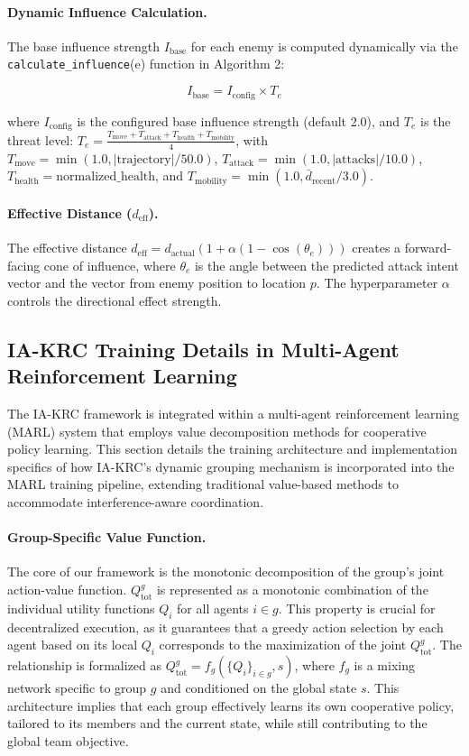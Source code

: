 \paragraph{Dynamic Influence Calculation.}
The base influence strength $I_{\text{base}}$ for each enemy is computed dynamically via the \texttt{calculate\_influence}(e) function in Algorithm 2:

\[ I_{\text{base}} = I_{\text{config}} \times T_e \]

where $I_{\text{config}}$ is the configured base influence strength (default 2.0), and $T_e$ is the threat level: $T_e = \frac{T_{\text{move}} + T_{\text{attack}} + T_{\text{health}} + T_{\text{mobility}}}{4}$, with $T_{\text{move}} = \min(1.0, |\text{trajectory}| / 50.0)$, $T_{\text{attack}} = \min(1.0, |\text{attacks}| / 10.0)$, $T_{\text{health}} = \text{normalized\_health}$, and $T_{\text{mobility}} = \min(1.0, \bar{d}_{\text{recent}} / 3.0)$.

\paragraph{Effective Distance ($d_{\text{eff}}$).}
The effective distance $d_{\text{eff}} = d_{\text{actual}} (1 + \alpha (1 - \cos(\theta_e)))$ creates a forward-facing cone of influence, where $\theta_e$ is the angle between the predicted attack intent vector and the vector from enemy position to location $p$. The hyperparameter $\alpha$ controls the directional effect strength.

\subsection{IA-KRC Training Details in Multi-Agent Reinforcement Learning}

The IA-KRC framework is integrated within a multi-agent reinforcement learning (MARL) system that employs value decomposition methods for cooperative policy learning. This section details the training architecture and implementation specifics of how IA-KRC's dynamic grouping mechanism is incorporated into the MARL training pipeline, extending traditional value-based methods to accommodate interference-aware coordination.

\paragraph{Group-Specific Value Function.} The core of our framework is the monotonic decomposition of the group's joint action-value function. $Q_{\text{tot}}^g$ is represented as a monotonic combination of the individual utility functions $Q_i$ for all agents $i \in g$. This property is crucial for decentralized execution, as it guarantees that a greedy action selection by each agent based on its local $Q_i$ corresponds to the maximization of the joint $Q_{\text{tot}}^g$. The relationship is formalized as $Q_{\text{tot}}^g = f_g(\{Q_i\}_{i \in g}, s)$, where $f_g$ is a mixing network specific to group $g$ and conditioned on the global state $s$. This architecture implies that each group effectively learns its own cooperative policy, tailored to its members and the current state, while still contributing to the global team objective.

